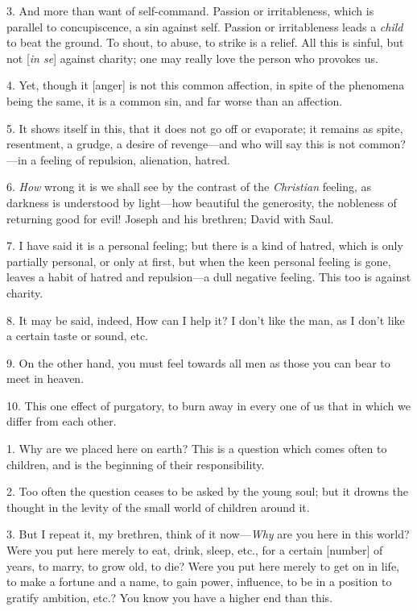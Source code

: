 3. And more than want of self-command. Passion or
irritableness, which is parallel to concupiscence, a sin against self.
Passion or irritableness leads a \emph{child} to beat the ground. To
shout, to abuse, to strike is a relief. All this is sinful, but not [\emph{in
se}] against charity; one may really love the person who provokes
us.

4. Yet, though it [anger] is not this common
affection, in spite of the phenomena being the same, it is a common
sin, and far worse than an affection.

5. It shows itself in this, that it does not go
off or evaporate; it remains as spite, resentment, a grudge, a desire
of revenge—and who will say this is not common?—in a feeling of
repulsion, alienation, hatred.

6. \emph{How} wrong it is we shall see by the
contrast of the \emph{Christian} feeling, as darkness is understood by
light—how beautiful the generosity, the nobleness of returning good
for evil! Joseph and his brethren; David with Saul.

7. I have said it is a personal feeling; but
there is a kind of hatred, which is only partially personal, or only
at first, but when the keen personal feeling is gone, leaves a habit
of hatred and repulsion—a dull negative feeling. This too is against
charity.

8. It may be said, indeed, How can I help it? I
don't like the man, as I don't like a certain taste or sound,
etc.

9. On the other hand, you must feel towards all
men as those you can bear to meet in heaven.

10. This one effect of purgatory, to burn away in
every one of us that in which we differ from each other.


1. Why are we placed here on earth? This is a
question which comes often to children, and is the beginning of their
responsibility.

2. Too often the question ceases to be asked by
the young soul; but it drowns the thought in the levity of the small
world of children around it.

3. But I repeat it, my brethren, think of it
now—\emph{Why} are you here in this world? Were you put here merely
to eat, drink, sleep, etc., for a certain [number] of years, to marry,
to grow old, to die? Were you put here merely to get on in life, to
make a fortune and a name, to gain power, influence, to be in a
position to gratify ambition, etc.? You know you have a higher end
than this.

